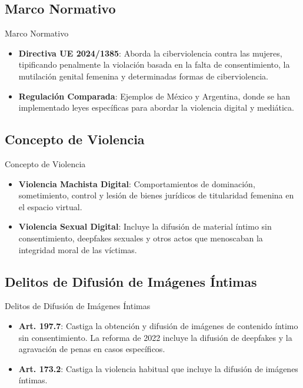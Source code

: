 \documentclass{beamer}
\begin{document}
    \subsection{Marco Normativo}
    \begin{frame}{Marco Normativo}
        \begin{itemize}
            \item \textbf{Directiva UE 2024/1385}: Aborda la ciberviolencia contra las mujeres, tipificando penalmente la violación basada en la falta de consentimiento, la mutilación genital femenina y determinadas formas de ciberviolencia.
            \item \textbf{Regulación Comparada}: Ejemplos de México y Argentina, donde se han implementado leyes específicas para abordar la violencia digital y mediática.
        \end{itemize}
    \end{frame}

    \subsection{Concepto de Violencia}
    \begin{frame}{Concepto de Violencia}
        \begin{itemize}
            \item \textbf{Violencia Machista Digital}: Comportamientos de dominación, sometimiento, control y lesión de bienes jurídicos de titularidad femenina en el espacio virtual.
            \item \textbf{Violencia Sexual Digital}: Incluye la difusión de material íntimo sin consentimiento, deepfakes sexuales y otros actos que menoscaban la integridad moral de las víctimas.
        \end{itemize}
    \end{frame}

    \subsection{Delitos de Difusión de Imágenes Íntimas}
    \begin{frame}{Delitos de Difusión de Imágenes Íntimas}
        \begin{itemize}
            \item \textbf{Art. 197.7}: Castiga la obtención y difusión de imágenes de contenido íntimo sin consentimiento. La reforma de 2022 incluye la difusión de deepfakes y la agravación de penas en casos específicos.
            \item \textbf{Art. 173.2}: Castiga la violencia habitual que incluye la difusión de imágenes íntimas.
        \end{itemize}
    \end{frame}
\end{document}
